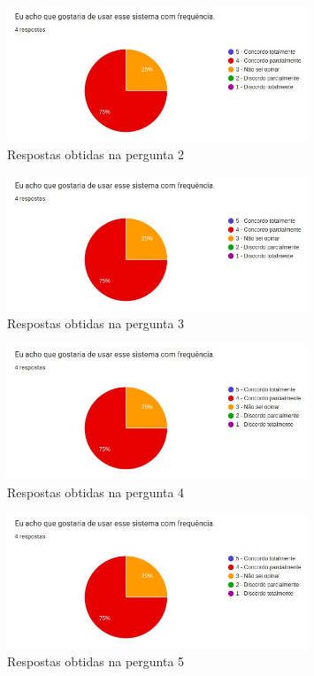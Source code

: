 \documentclass[12pt]{tcc}
\begin{document}
	\pagebreak

	\begin{figure}[!ht]
		\centering
		\includegraphics[width=0.8\textwidth]{figures/respostas-pergunta-2.jpeg}
		\caption{Respostas obtidas na pergunta 2}
		\label{fig:respostas-pergunta-2}
	\end{figure}

	\begin{figure}[!ht]
		\centering
		\includegraphics[width=0.8\textwidth]{figures/respostas-pergunta-3.jpeg}
		\caption{Respostas obtidas na pergunta 3}
		\label{fig:respostas-pergunta-3}
	\end{figure}

	\begin{figure}[!ht]
		\centering
		\includegraphics[width=0.8\textwidth]{figures/respostas-pergunta-4.jpeg}
		\caption{Respostas obtidas na pergunta 4}
		\label{fig:respostas-pergunta-4}
	\end{figure}

	\begin{figure}[!ht]
		\centering
		\includegraphics[width=0.8\textwidth]{figures/respostas-pergunta-5.jpeg}
		\caption{Respostas obtidas na pergunta 5}
		\label{fig:respostas-pergunta-5}
	\end{figure}
\end{document}
